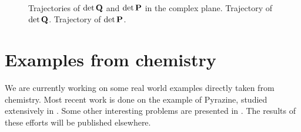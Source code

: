 \begin{figure}
  \centering
   \\
  \caption[Trajectories of the spread matrices]{
    Trajectories of $\det\mathbf{Q}$ and $\det\mathbf{P}$ in the complex plane.
     Trajectory of $\det\mathbf{Q}$.
     Trajectory of $\det\mathbf{P}$.
    \label{fig:ca3d_traject_QP}
  }
\end{figure}


\FloatBarrier
\section{Examples from chemistry}


We are currently working on some real world examples directly taken from chemistry.
Most recent work is done on the example of Pyrazine, studied extensively in
\cite{Lasser, lee_heller, westermann, Xie_Guo_Amatatsu_Kosloff}. Some other interesting
problems are presented in \cite{Sardar, Adhikari}. The results of these efforts will be
published elsewhere.
